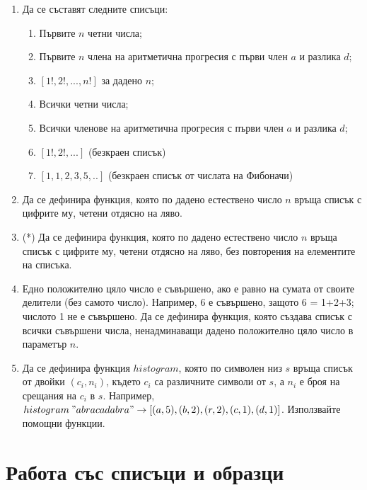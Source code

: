 \begin{enumerate}[]

  \item Да се съставят следните списъци:
	\renewcommand{\theenumii}{\Alph{enumii}}

	\begin{enumerate}[label=\alph*)]%
			 \item Първите $n$ четни числа;
			 \item Първите $n$ члена на аритметична прогресия с първи член $a$ и разлика $d$;
			 \item $[1!, 2!, ..., n!]$ за дадено $n$;
			 \item Всички четни числа;
			 \item Всички членове на аритметична прогресия с първи член $a$ и разлика $d$;
			 \item $[1!, 2!, ...]$ (безкраен списък)
			 \item $[1, 1, 2, 3, 5, ..]$ (безкраен списък от числата на Фибоначи)
  \end{enumerate}

  \item Да се дефинира функция, която по дадено естествено число $n$ връща списък с цифрите му, четени отдясно на ляво.

  \item(*) Да се дефинира функция, която по дадено естествено число $n$ връща списък с цифрите му, четени отдясно на ляво, без повторения на елементите на списъка.

  \item Едно положително цяло число е съвършено, ако е равно на сумата от своите делители (без самото число). Например, 6 е съвършено, защото 6 = 1+2+3; числото 1 не е съвършено. Да се дефинира функция, която създава списък с  всички съвършени числа, ненадминаващи дадено положително цяло число в параметър $n$.
  
  \item Да се дефинира функция $histogram$, която по символен низ $s$ връща списък от двойки $(c_i,n_i)$, където $c_i$ са различните символи от $s$, а $n_i$ е броя на срещания на $c_i$ в $s$. Например, $histogram \: "abracadabra" \rightarrow [(a,5), (b,2), (r,2), (c,1), (d,1)]$. Използвайте помощни функции.
\end{enumerate}

\section {Работа със списъци и образци}

